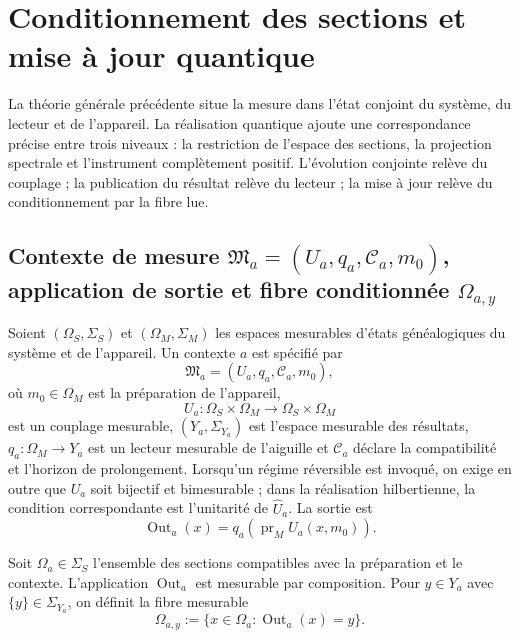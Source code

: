 
\section{Conditionnement des sections et mise à jour quantique}
\label{sec:medicion-cuantica-genealogica-rev2}

La théorie générale précédente situe la mesure dans l’état conjoint du système, du lecteur et de l’appareil. La réalisation quantique ajoute une correspondance précise entre trois niveaux : la restriction de l’espace des sections, la projection spectrale et l’instrument complètement positif. L’évolution conjointe relève du couplage ; la publication du résultat relève du lecteur ; la mise à jour relève du conditionnement par la fibre lue.

\subsection{Contexte de mesure \(\mathfrak M_a=(U_a,q_a,\mathcal C_a,m_0)\), application de sortie et fibre conditionnée \(\Omega_{a,y}\)}

Soient \((\Omega_S,\Sigma_S)\) et \((\Omega_M,\Sigma_M)\) les espaces mesurables d’états généalogiques du système et de l’appareil. Un contexte \(a\) est spécifié par
\begin{equation}
 \mathfrak M_a=(U_a,q_a,\mathcal C_a,m_0),
 \label{eq:contexto-medida-rev2}
\end{equation}
où \(m_0\in\Omega_M\) est la préparation de l’appareil,
\[
 U_a:\Omega_S\times\Omega_M
 \longrightarrow\Omega_S\times\Omega_M
\]
est un couplage mesurable, \((Y_a,\Sigma_{Y_a})\) est l’espace mesurable des résultats, \(q_a:\Omega_M\to Y_a\) est un lecteur mesurable de l’aiguille et \(\mathcal C_a\) déclare la compatibilité et l’horizon de prolongement. Lorsqu’un régime réversible est invoqué, on exige en outre que \(U_a\) soit bijectif et bimesurable ; dans la réalisation hilbertienne, la condition correspondante est l’unitarité de \(\widehat U_a\). La sortie est
\begin{equation}
 \operatorname{Out}_a(x)
 =q_a\!\left(\operatorname{pr}_M U_a(x,m_0)\right).
 \label{eq:salida-contexto-medida-rev2}
\end{equation}

Soit \(\Omega_a\in\Sigma_S\) l’ensemble des sections compatibles avec la préparation et le contexte. L’application \(\operatorname{Out}_a\) est mesurable par composition. Pour \(y\in Y_a\) avec \(\{y\}\in\Sigma_{Y_a}\), on définit la fibre mesurable
\begin{equation}
 \Omega_{a,y}
 :=\{x\in\Omega_a:\operatorname{Out}_a(x)=y\}.
 \label{eq:fibra-resultado-medida-rev2}
\end{equation}

